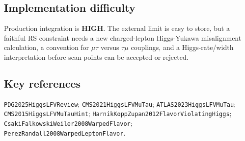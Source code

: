\subsection*{Implementation difficulty}
Production integration is \textbf{HIGH}.  The external limit is easy to store,
but a faithful RS constraint needs a new charged-lepton Higgs-Yukawa
misalignment calculation, a convention for \(\mu\tau\) versus \(\tau\mu\)
couplings, and a Higgs-rate/width interpretation before scan points can be
accepted or rejected.

\subsection*{Key references}
\texttt{PDG2025HiggsLFVReview}; \texttt{CMS2021HiggsLFVMuTau};
\texttt{ATLAS2023HiggsLFVMuTau}; \texttt{CMS2015HiggsLFVMuTauHint};
\texttt{HarnikKoppZupan2012FlavorViolatingHiggs};
\texttt{CsakiFalkowskiWeiler2008WarpedFlavor};
\texttt{PerezRandall2008WarpedLeptonFlavor}.
